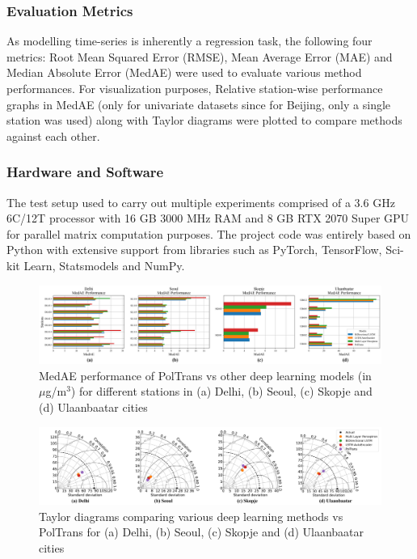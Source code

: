 \documentclass[10pt,journal]{IEEEtran}
\begin{document}
\subsubsection{Evaluation Metrics}
As modelling time-series is inherently a regression task, the following four metrics: Root Mean Squared Error (RMSE), Mean Average Error (MAE) and Median Absolute Error (MedAE) were used to evaluate various method performances. For visualization purposes, Relative station-wise performance graphs in MedAE (only for univariate datasets since for Beijing, only a single station was used) along with Taylor diagrams were plotted to compare methods against each other.

\subsubsection{Hardware and Software}
The test setup used to carry out multiple experiments comprised of a 3.6 GHz 6C/12T processor with 16 GB 3000 MHz RAM and 8 GB RTX 2070 Super GPU for parallel matrix computation purposes. The project code was entirely based on Python with extensive support from libraries such as PyTorch, TensorFlow, Sci-kit Learn, Statsmodels and NumPy.

\begin{figure}[h]
\centering
\includegraphics[scale=0.365]{../paper_figures/dl_medae.png}
\caption{MedAE performance of {PolTrans} vs other deep learning models (in $\mu$g/m$^{3}$) for different stations in (a) Delhi, (b) Seoul, (c) Skopje and (d) Ulaanbaatar cities}
\label{fig:dl-medae}
\end{figure}

\begin{figure}[h]
\centering
\includegraphics[width=18cm]{../paper_figures/merged_taylor_dl.png}
\caption{Taylor diagrams comparing various deep learning methods vs {PolTrans} for (a) Delhi, (b) Seoul, (c) Skopje and (d) Ulaanbaatar cities}
\label{fig:dl-taylor}
\end{figure}
\end{document}
